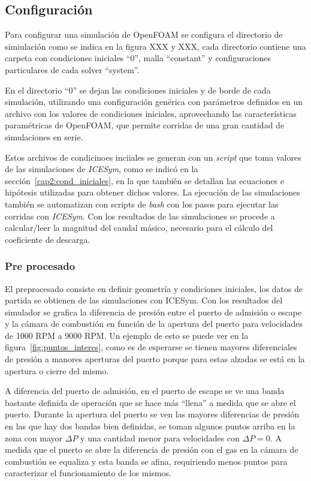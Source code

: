 
\subsection{Configuración}
%
Para configurar una simulación de OpenFOAM se configura el directorio de
simiulación como se indica en la figura XXX y XXX, cada directorio contiene una
carpeta con condiciones iniciales ``0'', malla ``constant'' y configuraciones
particulares de cada solver ``system''.

En el directorio ``0'' se dejan las condiciones iniciales y de borde de cada
simulación, utilizando una configuración genérica con parámetros definidos en un
archivo con los valores de condiciones iniciales, aprovechando las
características paramétricas de OpenFOAM, que permite corridas de una gran
cantidad de simulaciones en serie.

Estos archivos de condicinoes inciiales se generan con un \emph{script} que toma
valores de las simulaciones de \emph{ICESym}, como se indicó en la
sección~\ref{cap2:cond_iniciales}, en la que también se detallan las ecuaciones
e hipótesis utilizadas para obtener dichos valores.
%
La ejecución de las simulaciones también se automatizan con scripts de
\emph{bash} con los pasos para ejecutar las corridas con \emph{ICESym}.
%
Con los resultados de las simulaciones se procede a calcular/leer la magnitud
del caudal másico, necesario para el cálculo del coeficiente de descarga.

\subsubsection{Pre procesado}
%
El preprocesado consiste en definir geometría y condiciones iniciales, los datos
de partida  se obtienen de las simulaciones con ICESym.
%
Con los resultados del simulador se grafica la diferencia de presión entre
el puerto de admisión o escape y la cámara de combustión en función de
la apertura del puerto para velocidades de 1000 RPM a 9000 RPM.
%
Un ejemplo de esto se puede ver en la figura~\ref{fig:puntos_interes}, como
es de esperarse se tienen mayores diferenciales de presión a manores aperturas
del puerto porque para estas alzadas se está en la apertura o cierre del mismo.

A diferencia del puerto de admisión, en el puerto de escape se ve una banda
bastante definida de operación que se hace más ``llena'' a medida que se abre el
puerto.
%
Durante la apertura del puerto se ven las mayores diferencias de presión en las
que hay dos bandas bien definidas, se toman algunos puntos arriba en la zona con
mayor $\Delta P$ y una cantidad menor para velocidades con $\Delta P = 0$.
%
A medida que el puerto se abre la diferencia de presión con el gas en la cámara
de combustión se equaliza y esta banda se afina, requiriendo menos puntos para
caracterizar el funcionamiento de los mismos.

